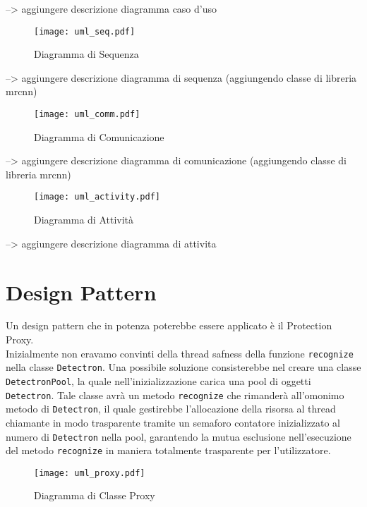 \documentclass[12pt,a4paper]{article}
\begin{document}
--> aggiungere descrizione diagramma caso d'uso

\begin{figure}[p]
  \caption{Diagramma di Sequenza}
  \centering
  \texttt{[image: uml\_seq.pdf]}
\end{figure}

--> aggiungere descrizione diagramma di sequenza (aggiungendo classe di libreria mrcnn)

\begin{figure}[p]
  \caption{Diagramma di Comunicazione}
  \centering
  \texttt{[image: uml\_comm.pdf]}
\end{figure}

--> aggiungere descrizione diagramma di comunicazione (aggiungendo classe di libreria mrcnn)

\begin{figure}[p]
  \caption{Diagramma di Attività}
  \centering
  \texttt{[image: uml\_activity.pdf]}
\end{figure}

--> aggiungere descrizione diagramma di attivita

\pagebreak

\section{Design Pattern}

Un design pattern che in potenza poterebbe essere applicato è il
Protection Proxy.\\
Inizialmente non eravamo convinti della thread safness della funzione
\texttt{recognize} nella classe \texttt{Detectron}. Una possibile
soluzione consisterebbe nel creare una classe \texttt{DetectronPool}, la
quale nell'inizializzazione carica una pool di oggetti
\texttt{Detectron}. Tale classe avrà un metodo \texttt{recognize} che
rimanderà all'omonimo metodo di \texttt{Detectron}, il quale gestirebbe
l'allocazione della risorsa al thread chiamante in modo trasparente
tramite un semaforo contatore inizializzato al numero di
\texttt{Detectron} nella pool, garantendo la mutua esclusione
nell'esecuzione del metodo \texttt{recognize} in maniera totalmente
trasparente per l'utilizzatore.

\begin{figure}[h]
  \caption{Diagramma di Classe Proxy}
  \centering
  \texttt{[image: uml\_proxy.pdf]}
\end{figure}
\end{document}
